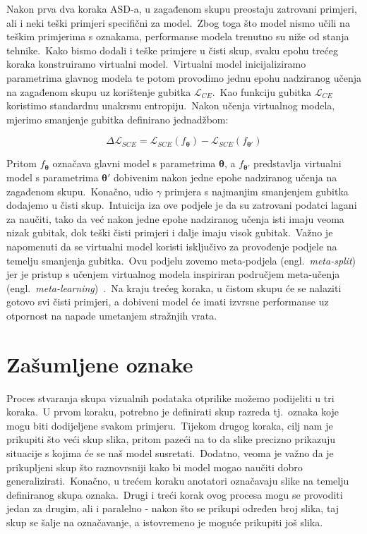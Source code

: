 \documentclass[diplomskirad]{fer}
\begin{document}
Nakon prva dva koraka ASD-a, u zagađenom skupu preostaju zatrovani primjeri, ali i neki teški primjeri specifični za model.\ 
Zbog toga što model nismo učili na teškim primjerima s oznakama, performanse modela trenutno su niže od stanja tehnike.\ Kako bismo dodali i teške primjere u čisti skup, svaku epohu trećeg koraka konstruiramo virtualni model.\ 
Virtualni model inicijaliziramo parametrima glavnog modela te potom provodimo jednu epohu nadziranog učenja na zagađenom skupu uz korištenje gubitka $\mathcal{L}_{CE}$.\ Kao funkciju gubitka $\mathcal{L}_{CE}$ koristimo standardnu unakrsnu entropiju.\ 
Nakon učenja virtualnog modela, mjerimo smanjenje gubitka definirano jednadžbom:

\begin{equation}
  \Delta \mathcal{L}_{SCE} = \mathcal{L}_{SCE}(f_{\bm{\theta}}) - \mathcal{L}_{SCE}(f_{\bm{\theta'}})
  \label{eq:asd}
\end{equation}

Pritom $f_{\bm{\theta}}$ označava glavni model s parametrima $\bm{\theta}$, a $f_{\bm{\theta'}}$ predstavlja virtualni model s parametrima $\bm{\theta'}$ dobivenim nakon jedne epohe nadziranog učenja na zagađenom skupu.\ 
Konačno, udio $\gamma$ primjera s najmanjim smanjenjem gubitka dodajemo u čisti skup.\ Intuicija iza ove podjele je da su zatrovani podatci lagani za naučiti, tako da već nakon jedne epohe nadziranog učenja isti imaju veoma nizak gubitak, dok teški čisti primjeri i dalje imaju visok gubitak.\ 
Važno je napomenuti da se virtualni model koristi isključivo za provođenje podjele na temelju smanjenja gubitka.\ 
Ovu podjelu zovemo meta-podjela (engl.\ \textit{meta-split}) jer je pristup s učenjem virtualnog modela inspiriran područjem meta-učenja (engl.\ \textit{meta-learning})~\cite{vilalta2002perspective}.\
Na kraju trećeg koraka, u čistom skupu će se nalaziti gotovo svi čisti primjeri, a dobiveni model će imati izvrsne performanse uz otpornost na napade umetanjem stražnjih vrata.\

\chapter{Zašumljene oznake}
\label{pog:zasumljene}

Proces stvaranja skupa vizualnih podataka otprilike možemo podijeliti u tri koraka.\ U prvom koraku, potrebno je definirati skup razreda tj.\ oznaka koje mogu biti dodijeljene svakom primjeru.\ 
Tijekom drugog koraka, cilj nam je prikupiti što veći skup slika, pritom pazeći na to da slike precizno prikazuju situacije s kojima će se naš model susretati.\ Dodatno, veoma je važno da je prikupljeni skup što raznovrsniji kako bi model mogao naučiti dobro generalizirati.\ 
Konačno, u trećem koraku anotatori označavaju slike na temelju definiranog skupa oznaka.\ Drugi i treći korak ovog procesa mogu se provoditi jedan za drugim, ali i paralelno - nakon što se prikupi određen broj slika, taj skup se šalje na označavanje, a istovremeno je moguće prikupiti još slika.\ 
  
\end{document}
